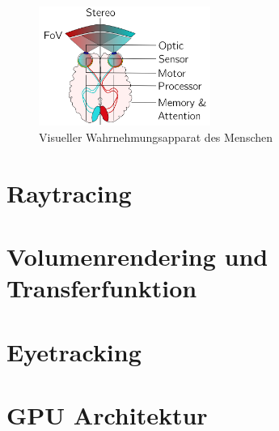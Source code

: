 \begin{figure}
	\centering
	\includegraphics[width=0.5\textwidth]{../../Grafiken/HVS-model_from-star-report.png}
	\caption{Visueller Wahrnehmungsapparat des Menschen \cite{doi:10.1111/cfg.13150}}
	\label{fig:eye01}
\end{figure}




\section{Raytracing}\label{sec::rc}

\section{Volumenrendering und Transferfunktion}\label{sec::voltff}

\section{Eyetracking}\label{sec::eyetr}

\section{GPU Architektur}\label{sec::gpuarc}
